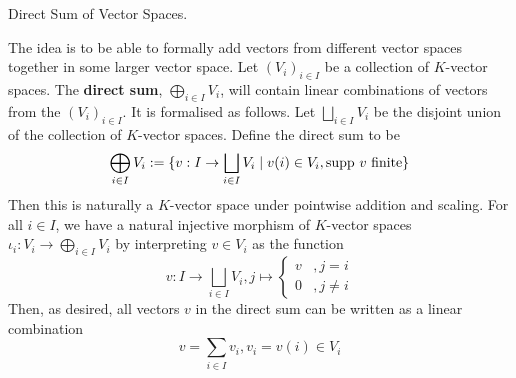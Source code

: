 \documentclass[../book.tex]{subfiles}
\begin{document}
\begin{dfn} Direct Sum of Vector Spaces.
    
    The idea is to be able to formally add vectors from different vector spaces
    together in some larger vector space.
    Let $(V_i)_{i\in I}$ be a collection of $K$-vector spaces.
    The \textbf{direct sum}, $\bigoplus_{i\in I}V_i$, 
    will contain linear combinations of vectors from the $(V_i)_{i\in I}$.
    It is formalised as follows. 
    Let $\bigsqcup_{i\in I} V_i$ be the disjoint union 
    of the collection of $K$-vector spaces.
    Define the direct sum to be \[
        \bigoplus_{i\in I} V_i := \{v : I \to \bigsqcup_{i\in I} V_i \mid 
        v(i) \in V_i, \text{supp } v \text{ finite}\}
    \]
    Then this is naturally a $K$-vector space under pointwise addition and scaling.
    For all $i \in I$, we have a natural injective morphism of $K$-vector spaces 
    $\iota_i : V_i \to \bigoplus_{i\in I} V_i$ by interpreting
    $v \in V_i$ as the function \[
        v : I \to \bigsqcup_{i\in I} V_i, j \mapsto \begin{cases}
            v   &, j = i\\
            
            0   &, j \neq i
        \end{cases}
    \]
    Then, as desired, all vectors $v$ in the direct sum can be written as
    a linear combination \[
        v = \sum_{i \in I} v_i , v_i = v(i) \in V_i
    \]
\end{dfn}
\end{document}
